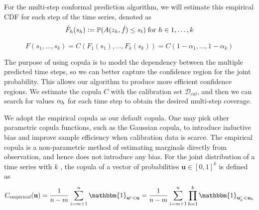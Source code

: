 For the multi-step conformal prediction algorithm, we will estimate this empirical CDF for each step of the time series, denoted as 
\begin{equation}
      \hat{F}_h(s_h) := {\mathbb{P}}(A(z_h, \hat{f}) \leq s_t) \;  \text{for } h \in 1, \ldots, k
\end{equation}

%

\begin{equation}
        F(s_1, \ldots, s_k) = C(F_1(s_1), \ldots, F_k(s_k))
    = C(1-\alpha_1, \ldots, 1-\alpha_k)
\end{equation}

 The purpose of using copula is to model the dependency between the multiple predicted time steps, so we can better capture the confidence region for the joint probability. This allows our algorithm to produce more efficient confidence regions. We estimate the copula $C$ with the calibration set $\mathcal{D}_{cal}$, and then we can search for values $\alpha_h$ for each time step to obtain the desired multi-step coverage. 

We adopt the empirical copula  as our default copula. One may pick other parametric copula functions, such as the Gaussian copula, to introduce inductive bias and improve sample efficiency when calibration data is scarce.  The empirical copula is a non-parametric method of estimating marginals directly from observation, and hence does not introduce any bias. For the joint distribution of a time series with $k$ , the copula of a vector of probabilities $\mathbf{u} \in [0,1]^k$ is defined as
\begin{equation}
C_{\text{empirical}} (\mathbf{u}) =  \frac{1}{n-m}\sum_{i=m+1}^{n} \mathbbm{1}_{\mathbf{u}^i <\mathbf{u}} = \frac{1}{n-m}\sum_{i=m+1}^{n} \prod_{h=1}^{k}  \mathbbm{1}_{\mathbf{u}^i_h <\mathbf{u}_h}
\label{eq:empiricalcopula}
\end{equation}


